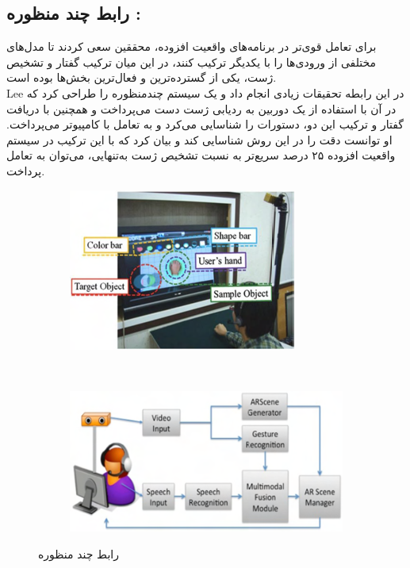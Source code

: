 \subsection{رابط چند منظوره\protect{} :}
برای تعامل قوی‌تر در برنامه‌های واقعیت افزوده، محققین سعی کردند تا مدل‌های مختلفی از ورودی‌ها را با یکدیگر ترکیب کنند، در این میان ترکیب گفتار و تشخیص ژست، یکی از گسترده‌ترین و فعال‌ترین بخش‌ها بوده است.
\\
Lee در این رابطه تحقیقات زیادی انجام داد و یک سیستم چندمنظوره را طراحی کرد که در آن با استفاده از یک دوربین به  ردیابی ژست دست می‌پرداخت و همچنین با دریافت گفتار و ترکیب این دو، دستورات را شناسایی می‌کرد و به تعامل با کامپیوتر می‌پرداخت.
او توانست دقت را در این روش شناسایی کند و بیان کرد که با این ترکیب در سیستم واقعیت افزوده ۲۵ درصد سریع‌تر به نسبت تشخیص ژست به‌تنهایی، می‌توان به تعامل پرداخت\cite{Lee2}.
\begin{figure}[!ht]
	\centering
	\begin{subfigure}[b]{0.5\textwidth}
		\includegraphics[width=\textwidth]{image/lee2}
		
		
	\end{subfigure}
	~ %
	\begin{subfigure}[b]{0.4\textwidth}
		\includegraphics[width=\textwidth]{image/lee1}
		
	\end{subfigure}
	\caption{رابط چند منظوره\cite{Lee2}}\label{fig:lee2}
\end{figure}

